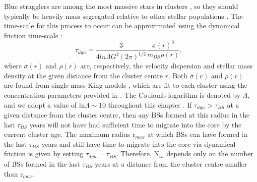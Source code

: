 Blue stragglers are among the most massive stars in clusters
\citep[e.g.][]{shara97, vandenberg01, mathieu09}, so they should
typically be heavily mass segregated relative to other stellar
populations \citep[e.g.][]{spitzer69, shara95, king95}.  The
time-scale for this process to occur 
can be approximated using the dynamical friction time-scale \citep{binney87}:
\begin{equation}
\label{eqn:t-dyn}
\tau_{dyn} = \frac{3}{4ln{\Lambda}G^2(2{\pi})^{1/2}}\frac{\sigma(r)^3}{m_{BS}\rho(r)},
\end{equation}  
where $\sigma(r)$ and $\rho(r)$ are, respectively, the velocity
dispersion and stellar mass density at the given distance from the
cluster centre $r$.  Both $\sigma(r)$ and $\rho(r)$ are found from
single-mass King models \citep{sigurdsson93}, which are fit to each
cluster using the 
concentration parameters provided in \citet{mclaughlin05}.  
The Coulomb logarithm is denoted by $\Lambda$, and we adopt
a value of ln$\Lambda \sim 10$ throughout this chapter 
\citep[e.g.][]{spitzer87, heggie03}.  If $\tau_{dyn} >
\tau_{BS}$ at a given distance from the 
cluster centre, then any BSs formed at this radius in the last
$\tau_{BS}$ years will not have had sufficient time to migrate into
the core by the current 
cluster age.  The maximum radius r$_{max}$ at which BSs can
have formed in the 
last $\tau_{BS}$ years and still have time to migrate into the core
via dynamical friction is given by setting $\tau_{dyn} = \tau_{BS}$.  
Therefore, N$_{in}$ depends only on the number of BSs formed in the last
$\tau_{BS}$ years at a distance from the cluster centre smaller than
r$_{max}$.  

